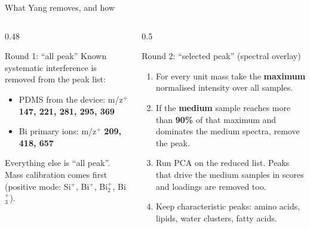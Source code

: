 \documentclass[aspectratio=169,10pt]{beamer}
\newcommand{\hl}[1]{{\color{warm}\bfseries #1}}
\begin{document}
\begin{frame}{What Yang removes, and how}
  \begin{columns}[T]
    \begin{column}{0.48\textwidth}
      \begin{block}{Round 1: ``all peak''}
        Known systematic interference is removed from the peak list:
        \begin{itemize}\setlength\itemsep{1mm}
          \item PDMS from the device: m/z$^+$ \hl{147, 221, 281, 295, 369}
          \item Bi primary ions: m/z$^+$ \hl{209, 418, 657}
        \end{itemize}
        Everything else is ``all peak''. Mass calibration comes first (positive mode: Si$^+$, Bi$^+$, Bi$_2^+$, Bi$_3^+$).
      \end{block}
    \end{column}
    \begin{column}{0.5\textwidth}
      \begin{block}{Round 2: ``selected peak'' (spectral overlay)}
        \begin{enumerate}\setlength\itemsep{1mm}
          \item For every unit mass take the \hl{maximum} normalised intensity over all samples.
          \item If the \hl{medium} sample reaches more than \hl{90\%} of that maximum and dominates the medium spectra, remove the peak.
          \item Run PCA on the reduced list. Peaks that drive the medium samples in scores and loadings are removed too.
          \item Keep characteristic peaks: amino acids, lipids, water clusters, fatty acids.
        \end{enumerate}
      \end{block}
    \end{column}
  \end{columns}
\end{frame}
\end{document}
